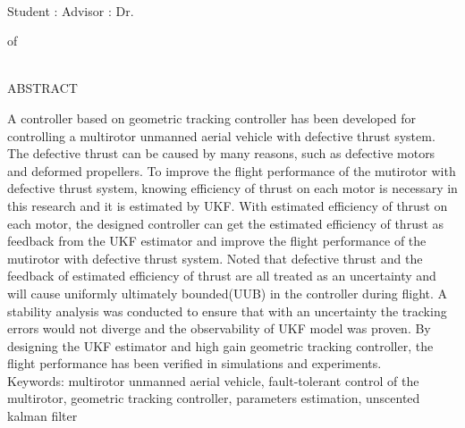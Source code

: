 \newpage
\begin{center}
    \begin{singlespace}
   	  \large \titleEn \\[0.8cm]
    \end{singlespace}

    Student : \studentEn  
    \hfill
    Advisor : Dr. \advisorEn \\[0.5cm]

   \begin{singlespace}
   \large \instituteEn{} of\\ \universityEn \\[0.5cm]
   \end{singlespace}
    
   \LARGE ABSTRACT \\[0.5cm]	
\end{center}

\normalsize 
A controller based on geometric tracking controller has been developed for controlling a multirotor unmanned aerial vehicle with defective thrust system. The defective thrust can be caused by many reasons, such as defective motors and deformed propellers. To improve the flight performance of the mutirotor with defective thrust system, knowing efficiency of thrust on each motor is necessary in this research and it is estimated by UKF. With estimated efficiency of thrust on each motor, the designed controller can get the estimated efficiency of thrust as feedback from the UKF estimator and improve the flight performance of the mutirotor with defective thrust system. Noted that defective thrust and the feedback of estimated efficiency of thrust are all treated as an uncertainty and will cause uniformly ultimately bounded(UUB) in the controller during flight. A stability analysis was conducted to ensure that with an uncertainty the tracking errors would not diverge and the observability of UKF model was proven. By designing the UKF estimator and high gain geometric tracking controller, the flight performance has been verified in simulations and experiments. \\[0.7cm]

Keywords: multirotor unmanned aerial vehicle, fault-tolerant control of the multirotor, geometric tracking controller, parameters estimation, unscented kalman filter